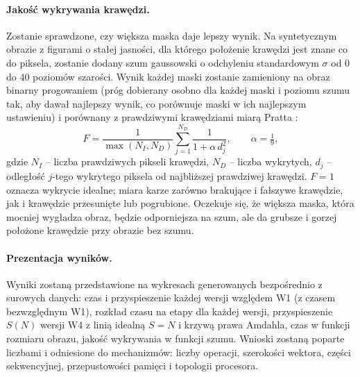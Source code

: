 \documentclass[12pt,a4paper]{article}
\begin{document}
\paragraph{Jakość wykrywania krawędzi.} Zostanie sprawdzone, czy większa maska daje lepszy wynik. Na syntetycznym obrazie z figurami o stałej jasności, dla którego położenie krawędzi jest znane co do piksela, zostanie dodany szum gaussowski o odchyleniu standardowym $\sigma$ od 0 do 40 poziomów szarości. Wynik każdej maski zostanie zamieniony na obraz binarny progowaniem (próg dobierany osobno dla każdej maski i poziomu szumu tak, aby dawał najlepszy wynik, co porównuje maski w ich najlepszym ustawieniu) i porównany z prawdziwymi krawędziami miarą Pratta \cite{pratt}:
\begin{equation}
	F = \frac{1}{\max(N_I, N_D)} \sum_{j=1}^{N_D} \frac{1}{1 + \alpha\, d_j^{2}}, \qquad \alpha = \tfrac{1}{9},
\end{equation}
gdzie $N_I$ -- liczba prawdziwych pikseli krawędzi, $N_D$ -- liczba wykrytych, $d_j$ -- odległość $j$-tego wykrytego piksela od najbliższej prawdziwej krawędzi. $F = 1$ oznacza wykrycie idealne; miara karze zarówno brakujące i fałszywe krawędzie, jak i krawędzie przesunięte lub pogrubione. Oczekuje się, że większa maska, która mocniej wygładza obraz, będzie odporniejsza na szum, ale da grubsze i gorzej położone krawędzie przy obrazie bez szumu.

\paragraph{Prezentacja wyników.} Wyniki zostaną przedstawione na wykresach generowanych bezpośrednio z surowych danych: czas i przyspieszenie każdej wersji względem W1 (z czasem bezwzględnym W1), rozkład czasu na etapy dla każdej wersji, przyspieszenie $S(N)$ wersji W4 z linią idealną $S = N$ i krzywą prawa Amdahla, czas w funkcji rozmiaru obrazu, jakość wykrywania w funkcji szumu. Wnioski zostaną poparte liczbami i odniesione do mechanizmów: liczby operacji, szerokości wektora, części sekwencyjnej, przepustowości pamięci i topologii procesora.
\end{document}
